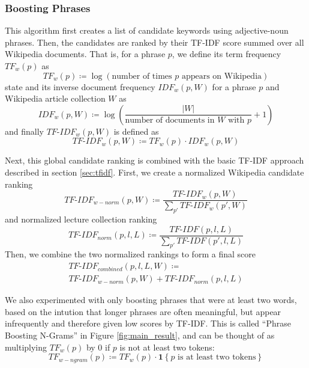\subsubsection{Boosting Phrases}

This algorithm first creates a list of candidate keywords using adjective-noun phrases. Then, the candidates are ranked by their TF-IDF score summed over all Wikipedia documents. That is, for a phrase $p$, we define its term frequency $TF_w(p)$ as
\begin{equation*}
TF_w(p) \coloneqq \log\left(\text{number of times } p \text{ appears on Wikipedia}\right)
\end{equation*}state
and its inverse document frequency $IDF_w(p, W)$ for a phrase $p$ and Wikipedia article collection $W$ as
\begin{equation*}
IDF_w(p, W) \coloneqq \log\left(\frac{|W|}{\text{number of documents in } W \text{ with } p} + 1\right)
\end{equation*}
and finally $TF\text{-}IDF_w(p, W)$ is defined as
\begin{equation*}
TF\text{-}IDF_w(p, W) \coloneqq TF_w(p) \cdot IDF_w(p, W)
\end{equation*}

Next, this global candidate ranking is combined with the basic TF-IDF approach described in section \ref{sec:tfidf}. First, we create a normalized Wikipedia candidate ranking
\begin{equation*}
TF\text{-}IDF_{w-norm}(p, W) \coloneqq \frac{TF\text{-}IDF_w(p, W)}{\sum_{p'} TF\text{-}IDF_w(p', W)}
\end{equation*}
and normalized lecture collection ranking
\begin{equation*}
TF\text{-}IDF_{norm}(p, l, L) \coloneqq \frac{TF\text{-}IDF(p, l, L)}{\sum_{p'} TF\text{-}IDF(p', l, L)}
\end{equation*}
Then, we combine the two normalized rankings to form a final score
\begin{multline*}
TF\text{-}IDF_{combined}(p, l, L, W) \coloneqq \\ TF\text{-}IDF_{w-norm}(p, W) + TF\text{-}IDF_{norm}(p, l, L)
\end{multline*}

We also experimented with only boosting phrases that were at least two words, based on the intution that longer phrases are often meaningful, but appear infrequently and therefore given low scores by TF-IDF. This is called ``Phrase Boosting N-Grams'' in Figure \ref{fig:main_result}, and can be thought of as multiplying $TF_w(p)$ by 0 if $p$ is not at least two tokens:
\begin{equation*}
TF_{w-ngram}(p) \coloneqq TF_w(p) \cdot \mathbf{1}\left\{p \text{ is at least two tokens}\right\}
\end{equation*}

